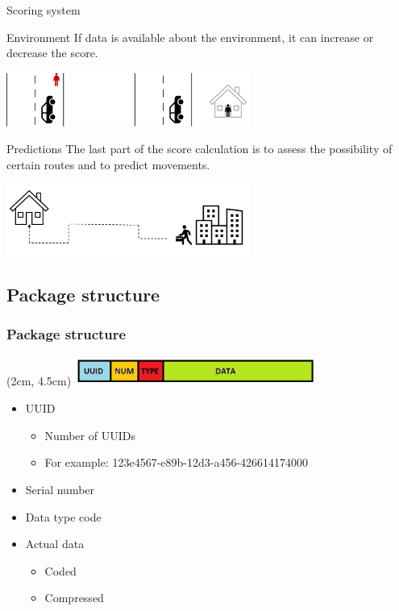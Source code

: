 \documentclass{beamer}
\begin{document}
\begin{frame}{Scoring system}
        \begin{block}{Environment}
            If data is available about the environment, it can increase or decrease the score.
        \end{block}
        \vspace{0.1cm}
        \centering
        \includegraphics[width=0.6\textwidth]{pics/environment}
        \vspace{0.5cm}
        \begin{block}{Predictions}
            The last part of the score calculation is to assess the possibility of certain routes and to predict movements.
        \end{block}
        \centering
        \includegraphics[width=0.6\textwidth]{pics/route_prediction}

\end{frame}

\subsection{Package structure}

\begin{frame}
    \frametitle{Package structure}
    \begin{textblock*}{5cm}(2cm, 4.5cm) %
        \includegraphics[width=8cm]{pics/Package structure.png}
    \end{textblock*}
    \begin{itemize}
        \item UUID
            \begin{itemize}
                \item Number of UUIDs
                \item For example:  123e4567-e89b-12d3-a456-426614174000
            \end{itemize}
        \item Serial number
        \item Data type code
        \item Actual data
            \begin{itemize}
                \item Coded
                \item Compressed
            \end{itemize}
    \end{itemize}
\end{frame}
\end{document}
